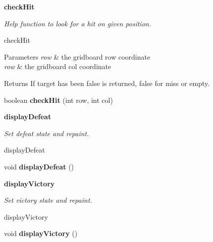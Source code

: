 \begin{Indent}{\bf check\+Hit}\par
{\em Help function to look for a hit on given position.

check\+Hit


\begin{DoxyParams}{Parameters}
{\em row} & the gridboard row coordinate \\
\hline
{\em row} & the gridboard col coordinate \\
\hline
\end{DoxyParams}
\begin{DoxyReturn}{Returns}
If target has been false is returned, false for miss or empty. 
\end{DoxyReturn}
}\begin{DoxyCompactItemize}
\item 
\hypertarget{classbattleship_1_1gameboard_1_1Gameboard_ac894c0826a4929fd237e722831d2aaac}{}boolean {\bfseries check\+Hit} (int row, int col)\label{classbattleship_1_1gameboard_1_1Gameboard_ac894c0826a4929fd237e722831d2aaac}

\end{DoxyCompactItemize}
\end{Indent}
\begin{Indent}{\bf display\+Defeat}\par
{\em Set defeat state and repaint.

display\+Defeat }\begin{DoxyCompactItemize}
\item 
\hypertarget{classbattleship_1_1gameboard_1_1Gameboard_a204463ca6f43a5cf7cc016841288b72c}{}void {\bfseries display\+Defeat} ()\label{classbattleship_1_1gameboard_1_1Gameboard_a204463ca6f43a5cf7cc016841288b72c}

\end{DoxyCompactItemize}
\end{Indent}
\begin{Indent}{\bf display\+Victory}\par
{\em Set victory state and repaint.

display\+Victory }\begin{DoxyCompactItemize}
\item 
\hypertarget{classbattleship_1_1gameboard_1_1Gameboard_a2dd6dd249dd78d850fd0fb1ef43fd815}{}void {\bfseries display\+Victory} ()\label{classbattleship_1_1gameboard_1_1Gameboard_a2dd6dd249dd78d850fd0fb1ef43fd815}

\end{DoxyCompactItemize}
\end{Indent}
